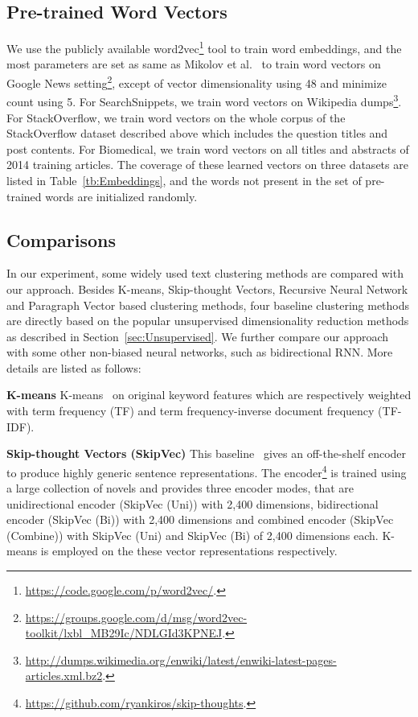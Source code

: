 \documentclass[review]{elsarticle}
\begin{document}
\subsection{Pre-trained Word Vectors}
We use the publicly available word2vec\footnote{\url{https://code.google.com/p/word2vec/}.} tool to train word embeddings, and the most parameters are set as same as Mikolov et al.~\cite{21_mikolov2013distributed} to train word vectors on Google News setting\footnote{\url{https://groups.google.com/d/msg/word2vec-toolkit/lxbl_MB29Ic/NDLGId3KPNEJ}.}, except of vector dimensionality using 48 and minimize count using 5. For SearchSnippets, we train word vectors on Wikipedia dumps\footnote{\url{http://dumps.wikimedia.org/enwiki/latest/enwiki-latest-pages-articles.xml.bz2}.}. For StackOverflow, we train word vectors on the whole corpus of the StackOverflow dataset described above which includes the question titles and post contents. For Biomedical, we train word vectors on all titles and abstracts of 2014 training articles. The coverage of these learned vectors on three datasets are listed in Table~\ref{tb:Embeddings}, and the words not present in the set of pre-trained words are initialized randomly.

\subsection{Comparisons}
\label{sec:Comparisons}
In our experiment, some widely used text clustering methods are compared with our approach. Besides K-means, Skip-thought Vectors, Recursive Neural Network and Paragraph Vector based clustering methods, four baseline clustering methods are directly based on the popular unsupervised dimensionality reduction methods as described in Section~\ref{sec:Unsupervised}. We further compare our approach with some other non-biased neural networks, such as bidirectional RNN. More details are listed as follows:

{\bf{K-means}} K-means~\cite{2_wagstaff2001constrained} on original keyword features which are respectively weighted with term frequency (TF) and term frequency-inverse document frequency (TF-IDF).

{\bf{Skip-thought Vectors (SkipVec)}} This baseline~\cite{kiros2015skip} gives an off-the-shelf encoder to produce highly generic sentence representations. The encoder\footnote{\url{https://github.com/ryankiros/skip-thoughts}.} is trained using a large collection of novels and provides three encoder modes, that are unidirectional encoder (SkipVec (Uni)) with 2,400 dimensions, bidirectional encoder (SkipVec (Bi)) with 2,400 dimensions and combined encoder (SkipVec (Combine)) with SkipVec (Uni) and SkipVec (Bi) of 2,400 dimensions each. K-means is employed on the these vector representations respectively.
\end{document}
